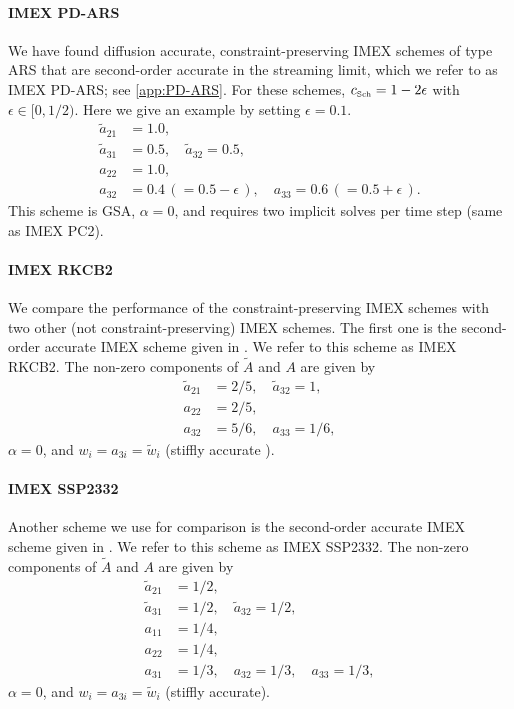 \paragraph{IMEX PD-ARS}

We have found diffusion accurate, constraint-preserving IMEX schemes of type ARS that are second-order accurate in the streaming limit, which we refer to as IMEX PD-ARS; see \ref{app:PD-ARS}.  
For these schemes, $c_{\mbox{\tiny Sch}}= 1 - 2\epsilon$ with $\epsilon \in [0, 1/2)$.
Here we give an example by setting $\epsilon=0.1$.
\begin{align*}
  \tilde{a}_{21} & = 1.0, \\
  \tilde{a}_{31} & = 0.5, \quad \tilde{a}_{32} = 0.5, \\
  a_{22} & = 1.0, \nonumber \\
  a_{32} & = 0.4 \,( = 0.5 - \epsilon\,), \quad a_{33} = 0.6 \,( = 0.5 + \epsilon\,). 
\end{align*}
This scheme is GSA, $\alpha=0$, and requires two implicit solves per time step (same as IMEX PC2).  

\paragraph{IMEX RKCB2}

We compare the performance of the constraint-preserving IMEX schemes with two other (not constraint-preserving) IMEX schemes.  
The first one is the second-order accurate IMEX scheme given in \cite{cavaglieriBewley2015}.  
We refer to this scheme as IMEX RKCB2.  
The non-zero components of $\tilde{A}$ and $A$ are given by
\begin{align*}
  \tilde{a}_{21} &= 2/5, \quad \tilde{a}_{32} = 1, \\
  a_{22} &= 2/5, \nonumber \\
  a_{32} &= 5/6, \quad a_{33} = 1/6,
\end{align*}
$\alpha=0$, and $w_{i} = a_{3i} = \tilde{w}_{i}$ (stiffly accurate \cite{pareschiRusso_2005}).

\paragraph{IMEX SSP2332}

Another scheme we use for comparison is the second-order accurate IMEX scheme given in \cite{pareschiRusso_2005}.  
We refer to this scheme as IMEX SSP2332.  
The non-zero components of $\tilde{A}$ and $A$ are given by
\begin{align*}
  \tilde{a}_{21} &= 1/2, \\
  \tilde{a}_{31} &= 1/2, \quad \tilde{a}_{32} = 1/2, \\
  a_{11} &= 1/4, \\
  a_{22} &= 1/4, \\
  a_{31} &= 1/3, \quad a_{32} = 1/3, \quad a_{33} = 1/3, 
\end{align*}
$\alpha=0$, and $w_{i} = a_{3i} = \tilde{w}_{i}$ (stiffly accurate).

